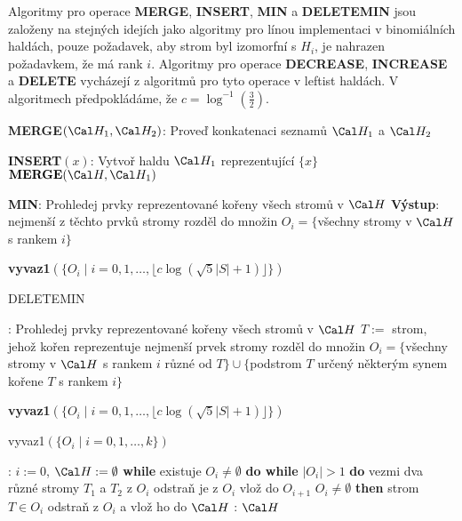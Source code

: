 \documentclass[a4paper,12pt]{article}
\begin{document}
Algoritmy pro operace {\bf MERGE}, {\bf INSERT}, {\bf MIN} a 
{\bf DELE\-TEMIN} jsou založeny na stejných idejích jako algoritmy pro línou implementaci 
v binomiálních haldách, pouze poža\-da\-vek, aby strom byl 
izomorfní s $H_i$, je nahrazen požadavkem, že má rank $
i$. 
Algoritmy pro ope\-race {\bf DECREASE}, {\bf INCREASE} a {\bf DELETE }
vycházejí z algoritmů pro tyto operace v leftist 
haldách. V algoritmech předpokládáme, že $c=\log^{-1}
(\frac 32)$.

{\bf MERGE$(\Cal H_1,\Cal H_2)$}:\newline 
Prove\v d konkatenaci seznamů $\Cal H_1$ a $\Cal H_2$

{\bf INSERT$(x)$}:\newline 
Vytvoř haldu $\Cal H_1$ reprezentující $\{x\}$\newline 
$\bold M\bold E\bold R\bold G\bold E(\Cal H,\Cal H_1)$

{\bf MIN}:\newline 
Prohledej prvky reprezentované kořeny všech 
stromů v $\Cal H$\newline 
{\bf Výstup}: nejmenší z těchto prvků\newline 
stromy rozděl do množin $O_i=\{$všechny stromy v 
$\Cal H$ s rankem $i\}$\newline 
{\bf vyvaz1$(\{O_i\mid i=0,1,\dots,\lfloor c\log(\sqrt 5|S|+1)\rfloor 
\})$

DELETEMIN}:\newline 
Prohledej prvky reprezentované kořeny všech 
stromů v $\Cal H$\newline 
$T:=$ strom, jehož kořen reprezentuje nejmenší 
prvek\newline 
stromy rozděl do množin $O_i=\{$všechny stromy v 
$\Cal H$ s rankem $i$ různé od $T\}\cup \{$podstrom $T$ určený 
některým synem kořene $T$ s 
rankem $i$$\}$\newline 
{\bf vyvaz1$(\{O_i\mid i=0,1,\dots,\lfloor c\log(\sqrt 5|S|+1)\rfloor 
\})$

vyvaz1$(\{O_i\mid i=0,1,\dots,k\})$}:\newline 
$i:=0$, $\Cal H:=\emptyset$\newline 
{\bf while} existuje $O_i\ne\emptyset$ {\bf do\newline 
\phantom{{\rm ---}}while} $|O_i|>1$ {\bf do\newline 
\phantom{{\rm ------}}}vezmi dva různé stromy $T_1$ a $
T_2$ z 
$O_i$\newline 
\phantom{------}odstraň je z $O_i$\newline 
\phantom{------}{\bf spoj$(T_1,T_2)$} vlož do $O_{i+1}$\newline 
{} $O_i\ne\emptyset$ {\bf then\newline 
\phantom{{\rm ------}}}strom $T\in O_i$ odstraň z $O_i$ a vlož ho do $
\Cal H$\newline 
{}: $\Cal H$
\end{document}
